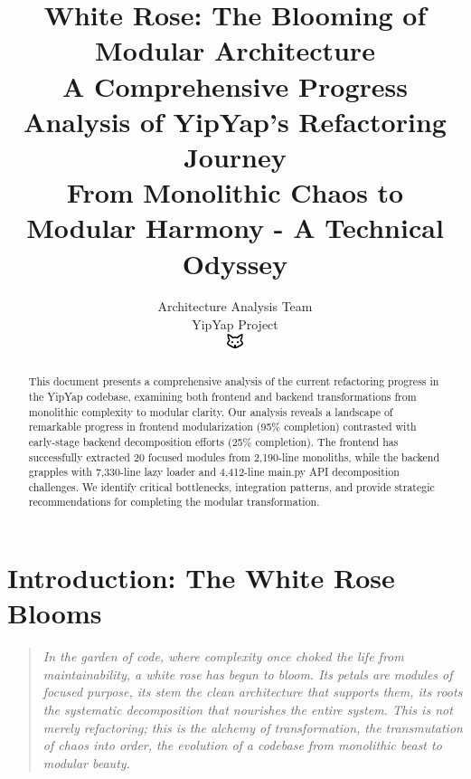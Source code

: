 \documentclass[11pt]{article}
\begin{document}
\title{\textbf{White Rose: The Blooming of Modular Architecture} \\
\Large{A Comprehensive Progress Analysis of YipYap's Refactoring Journey} \\
\large{From Monolithic Chaos to Modular Harmony - A Technical Odyssey}}

\author{Architecture Analysis Team\\
YipYap Project\\
\includegraphics[width=0.5cm]{favicon.pdf}}

\maketitle

\begin{abstract}
This document presents a comprehensive analysis of the current refactoring progress in the YipYap codebase, examining both frontend and backend transformations from monolithic complexity to modular clarity. Our analysis reveals a landscape of remarkable progress in frontend modularization (95\% completion) contrasted with early-stage backend decomposition efforts (25\% completion). The frontend has successfully extracted 20 focused modules from 2,190-line monoliths, while the backend grapples with 7,330-line lazy loader and 4,412-line main.py API decomposition challenges. We identify critical bottlenecks, integration patterns, and provide strategic recommendations for completing the modular transformation.
\end{abstract}

\tableofcontents
\newpage

\section{Introduction: The White Rose Blooms}

\begin{quote}
\emph{In the garden of code, where complexity once choked the life from maintainability, a white rose has begun to bloom. Its petals are modules of focused purpose, its stem the clean architecture that supports them, its roots the systematic decomposition that nourishes the entire system. This is not merely refactoring; this is the alchemy of transformation, the transmutation of chaos into order, the evolution of a codebase from monolithic beast to modular beauty.}
\end{quote}
\end{document}
